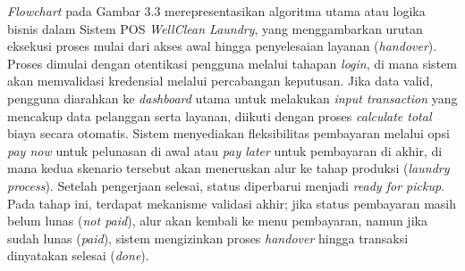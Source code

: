 \indent
\textit{Flowchart} pada Gambar 3.3 merepresentasikan algoritma utama atau logika bisnis dalam Sistem POS \textit{WellClean Laundry}, yang menggambarkan urutan eksekusi proses mulai dari akses awal hingga penyelesaian layanan (\textit{handover}). Proses dimulai dengan otentikasi pengguna melalui tahapan \textit{login}, di mana sistem akan memvalidasi kredensial melalui percabangan keputusan. Jika data valid, pengguna diarahkan ke \textit{dashboard} utama untuk melakukan \textit{input transaction} yang mencakup data pelanggan serta layanan, diikuti dengan proses \textit{calculate total} biaya secara otomatis. Sistem menyediakan fleksibilitas pembayaran melalui opsi \textit{pay now} untuk pelunasan di awal atau \textit{pay later} untuk pembayaran di akhir, di mana kedua skenario tersebut akan meneruskan alur ke tahap produksi (\textit{laundry process}). Setelah pengerjaan selesai, status diperbarui menjadi \textit{ready for pickup}. Pada tahap ini, terdapat mekanisme validasi akhir; jika status pembayaran masih belum lunas (\textit{not paid}), alur akan kembali ke menu pembayaran, namun jika sudah lunas (\textit{paid}), sistem mengizinkan proses \textit{handover} hingga transaksi dinyatakan selesai (\textit{done}).